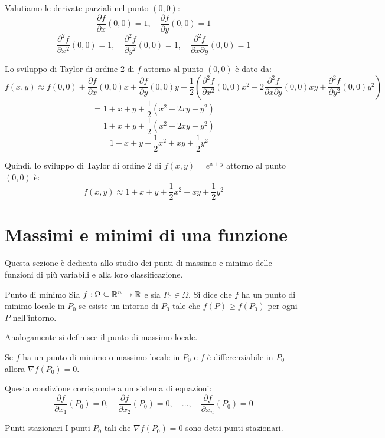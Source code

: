 Valutiamo le derivate parziali nel punto $(0,0)$:
\[
\frac{\partial f}{\partial x}(0,0) = 1, \quad \frac{\partial f}{\partial y}(0,0) = 1
\]
\[
\frac{\partial^2 f}{\partial x^2}(0,0) = 1, \quad \frac{\partial^2 f}{\partial y^2}(0,0) = 1, \quad \frac{\partial^2 f}{\partial x \partial y}(0,0) = 1
\]

Lo sviluppo di Taylor di ordine 2 di $f$ attorno al punto $(0,0)$ è dato da:
\[
f(x,y) \approx f(0,0) + \frac{\partial f}{\partial x}(0,0)x + \frac{\partial f}{\partial y}(0,0)y + \frac{1}{2}\left( \frac{\partial^2 f}{\partial x^2}(0,0)x^2 + 2\frac{\partial^2 f}{\partial x \partial y}(0,0)xy + \frac{\partial^2 f}{\partial y^2}(0,0)y^2 \right)
\]
\[
= 1 + x + y + \frac{1}{2}(x^2 + 2xy + y^2)
\]
\[
= 1 + x + y + \frac{1}{2}(x^2 + 2xy + y^2)
\]
\[
= 1 + x + y + \frac{1}{2}x^2 + xy + \frac{1}{2}y^2
\]

Quindi, lo sviluppo di Taylor di ordine 2 di $f(x,y) = e^{x+y}$ attorno al punto $(0,0)$ è:
\[
f(x,y) \approx 1 + x + y + \frac{1}{2}x^2 + xy + \frac{1}{2}y^2
\]

\section{Massimi e minimi di una funzione}

Questa sezione è dedicata allo studio dei punti di massimo e minimo delle funzioni di più variabili e alla loro classificazione.

\begin{definizione}{Punto di minimo}
  Sia $f:\Omega \subseteq \mathbb{R}^n \rightarrow \mathbb{R}$ e sia $P_0 \in \Omega$. Si dice che $f$ ha un punto di minimo locale in $P_0$ se esiste un intorno di $P_0$ tale che $f(P) \geq f(P_0)$ per ogni $P$ nell'intorno.
\end{definizione}
Analogamente si definisce il punto di massimo locale.
\begin{teorema}{}
  Se $f$ ha un punto di minimo o massimo locale in $P_0$ e $f$ è differenziabile in $P_0$ allora $\nabla f(P_0) = 0$.
\end{teorema}


\begin{osservazione}{}
  Questa condizione corrisponde a un sistema di equazioni:
  \[
  \frac{\partial f}{\partial x_1}(P_0) = 0, \quad \frac{\partial f}{\partial x_2}(P_0) = 0, \quad \dots, \quad \frac{\partial f}{\partial x_n}(P_0) = 0
  \]
\end{osservazione}

\begin{definizione}{Punti stazionari}
  I punti $P_0$ tali che $\nabla f(P_0) = 0$ sono detti punti stazionari.
\end{definizione}

